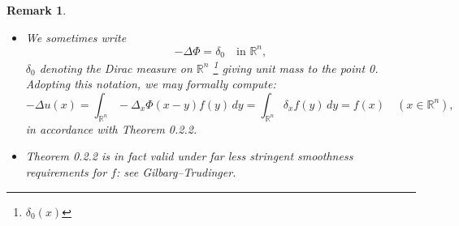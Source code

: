 \documentclass[a4paper,12pt]{report}
\newtheorem{remark}{Remark}[section]
\begin{document}
\begin{remark}
\begin{itemize}
    \item[(i)] We sometimes write
    \[
        -\Delta \Phi = \delta_0 \quad \text{in } \mathbb{R}^n,
    \]
    $\delta_0$ denoting the Dirac measure on $\mathbb{R}^n$ \footnote{\(\delta_0 (x)\)} giving unit mass to the point 0. Adopting this notation, we may formally compute:
    \[
        -\Delta u(x) = \int_{\mathbb{R}^n} -\Delta_x \Phi(x - y) f(y) \, dy
        = \int_{\mathbb{R}^n} \delta_x f(y) \, dy = f(x) \quad (x \in \mathbb{R}^n),
    \]
    in accordance with Theorem 0.2.2. 
    \item[(ii)] Theorem 0.2.2 is in fact valid under far less stringent smoothness requirements for $f$: see Gilbarg–Trudinger.
\end{itemize}
\end{remark}
\end{document}

